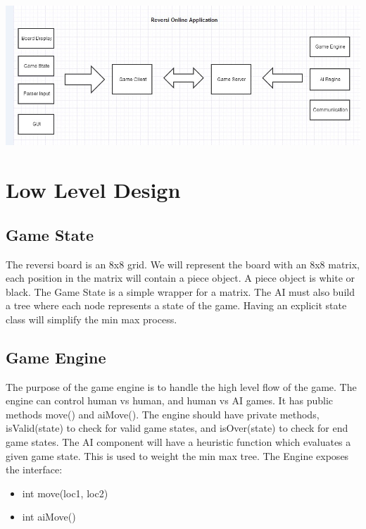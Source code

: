 \documentclass{article}
\begin{document}
\includegraphics[scale=0.4]{HighLvlDesign.png}

\section{Low Level Design}

\subsection{Game State}
The reversi board is an 8x8 grid. We will represent the board with an 8x8 matrix, each position
in the matrix will contain a piece object. A piece object is white or black.
The Game State is a simple wrapper for a matrix.
The AI must also build a tree where each node represents a state of the game. Having an explicit
state class will simplify the min max process.    

\subsection{Game Engine}
The purpose of the game engine is to handle the high level flow of the game. The engine
can control human vs human, and human vs AI games. It has public methods move() and aiMove().
The engine should have private methods, isValid(state) to check for valid game states, and isOver(state)
to check for end game states. The AI component will have a heuristic function which evaluates a given game
state. This is used to weight the min max tree. The Engine exposes the interface:
\begin{itemize}
\item int move(loc1, loc2) 
\item int aiMove()
\end{itemize}
\end{document}
